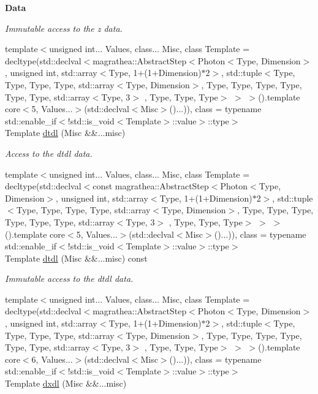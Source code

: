 \begin{Indent}{\bf Data}
\begin{DoxyCompactItemize}
\begin{DoxyCompactList}\small\item\em Immutable access to the z data. \end{DoxyCompactList}\item 
{\footnotesize template$<$unsigned int... Values, class... Misc, class Template  = decltype(std\-::declval$<$magrathea\-::\-Abstract\-Step$<$\-Photon$<$\-Type, Dimension$>$, unsigned int, std\-::array$<$\-Type, 1+(1+\-Dimension)$\ast$2$>$, std\-::tuple$<$\-Type, Type, Type, Type, std\-::array$<$\-Type, Dimension$>$, Type, Type, Type, Type, Type, Type, std\-::array$<$\-Type, 3$>$ , Type, Type, Type$>$ $>$ $>$().\-template core$<$5, Values...$>$(std\-::declval$<$\-Misc$>$()...)), class  = typename std\-::enable\-\_\-if$<$!std\-::is\-\_\-void$<$\-Template$>$\-::value$>$\-::type$>$ }\\Template \hyperlink{exceptionPhoton_ab593c356203e3a7ce2d82ecb987d0979}{dtdl} (Misc \&\&...misc)
\begin{DoxyCompactList}\small\item\em Access to the dtdl data. \end{DoxyCompactList}\item 
{\footnotesize template$<$unsigned int... Values, class... Misc, class Template  = decltype(std\-::declval$<$const magrathea\-::\-Abstract\-Step$<$\-Photon$<$\-Type, Dimension$>$, unsigned int, std\-::array$<$\-Type, 1+(1+\-Dimension)$\ast$2$>$, std\-::tuple$<$\-Type, Type, Type, Type, std\-::array$<$\-Type, Dimension$>$, Type, Type, Type, Type, Type, Type, std\-::array$<$\-Type, 3$>$ , Type, Type, Type$>$ $>$ $>$().\-template core$<$5, Values...$>$(std\-::declval$<$\-Misc$>$()...)), class  = typename std\-::enable\-\_\-if$<$!std\-::is\-\_\-void$<$\-Template$>$\-::value$>$\-::type$>$ }\\Template \hyperlink{exceptionPhoton_a1039705629b374ba0f8da204fabcdd52}{dtdl} (Misc \&\&...misc) const 
\begin{DoxyCompactList}\small\item\em Immutable access to the dtdl data. \end{DoxyCompactList}\item 
{\footnotesize template$<$unsigned int... Values, class... Misc, class Template  = decltype(std\-::declval$<$magrathea\-::\-Abstract\-Step$<$\-Photon$<$\-Type, Dimension$>$, unsigned int, std\-::array$<$\-Type, 1+(1+\-Dimension)$\ast$2$>$, std\-::tuple$<$\-Type, Type, Type, Type, std\-::array$<$\-Type, Dimension$>$, Type, Type, Type, Type, Type, Type, std\-::array$<$\-Type, 3$>$ , Type, Type, Type$>$ $>$ $>$().\-template core$<$6, Values...$>$(std\-::declval$<$\-Misc$>$()...)), class  = typename std\-::enable\-\_\-if$<$!std\-::is\-\_\-void$<$\-Template$>$\-::value$>$\-::type$>$ }\\Template \hyperlink{exceptionPhoton_a124644c9e1224ff3f26cc4825e7e177b}{dxdl} (Misc \&\&...misc)

\end{DoxyCompactItemize}
\end{Indent}
